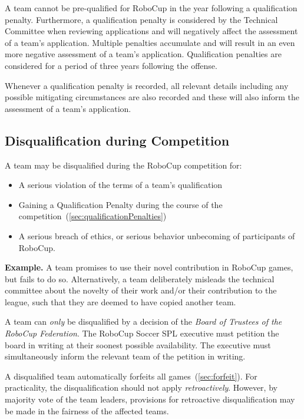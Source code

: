A team cannot be pre-qualified for RoboCup in the year following a qualification penalty. Furthermore, a qualification penalty is considered by the Technical Committee when reviewing applications and will negatively affect the assessment of a team's application. Multiple penalties accumulate and will result in an even more negative assessment of a team's application. Qualification penalties are considered for a period of three years following the offense.

Whenever a qualification penalty is recorded, all relevant details including any possible mitigating circumstances are also recorded and these will also inform the assessment of a team's application.

\subsection{Disqualification during Competition}
\label{sec:disqualification_during_comp}

A team may be disqualified during the RoboCup competition for:
\begin{itemize}
  \item A serious violation of the terms of a team's qualification
  \item Gaining a Qualification Penalty during the course of the competition~(\cf \cref{sec:qualificationPenalties})
  \item A serious breach of ethics, or serious behavior unbecoming of participants of RoboCup.
\end{itemize}

\textbf{Example.} A team promises to use their novel contribution in RoboCup games, but fails to do so.
Alternatively, a team deliberately misleads the technical committee about the novelty of their work and/or their contribution to the league, such that they are deemed to have copied another team.

A team can \textit{only} be disqualified by a decision of the \textit{Board of Trustees of the RoboCup Federation}.
The RoboCup Soccer SPL executive must petition the board in writing at their soonest possible availability.
The executive must simultaneously inform the relevant team of the petition in writing.

A disqualified team automatically forfeits all games~(\cf \cref{sec:forfeit}).
For practicality, the disqualification should not apply \textit{retroactively}.
However, by majority vote of the team leaders, provisions for retroactive disqualification may be made in the fairness of the affected teams.
